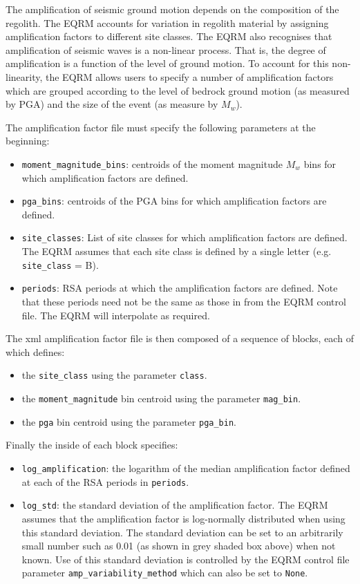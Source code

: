 The amplification of seismic ground motion depends on the composition 
of the regolith. The EQRM accounts for variation in regolith material by assigning 
amplification factors to different site classes. The EQRM also recognises that 
amplification of seismic waves is a non-linear process. That is, the degree
of amplification is a function of the level of ground motion. To account for 
this non-linearity, the EQRM allows users to specify a number of amplification 
factors which are grouped according to the level of bedrock ground motion (as 
measured by PGA) and the size of the event (as measure by $M_w$).

The amplification factor file must specify the following parameters at the beginning: 
\begin{itemize} 
\item \texttt{moment\_magnitude\_bins}: centroids of the moment magnitude $M_w$ bins
 for which amplification factors are defined. 
\item \texttt{pga\_bins}: centroids of the PGA bins for which amplification factors are defined.
\item \texttt{site\_classes}: List of site classes for which amplification factors are defined. 
The EQRM assumes that each site class is defined by a single letter (e.g. \texttt{site\_class} = B). 
\item \texttt{periods}: RSA periods at which the amplification factors are defined. Note that 
these periods need not be the same as those in  from the 
EQRM control file. The EQRM will interpolate as required. 
\end{itemize} 

The xml amplification factor file is then composed of a sequence of blocks, each of which 
defines:
\begin{itemize} 
\item the \texttt{site\_class} using the parameter \texttt{class}.
\item the \texttt{moment\_magnitude} bin centroid using the parameter \texttt{mag\_bin}. 
\item the \texttt{pga} bin centroid using the parameter \texttt{pga\_bin}. 
\end{itemize}

Finally the inside of each block specifies:
\begin{itemize}
\item \texttt{log\_amplification}: the logarithm of the median amplification factor defined at each 
of the RSA periods in \texttt{periods}.
\item \texttt{log\_std}: the standard deviation of the amplification factor. The EQRM assumes
 that the amplification factor is log-normally 
distributed when using this
standard deviation. The standard deviation can be set to an arbitrarily small 
number such as 0.01 (as shown in grey shaded box above) when not known. Use of this standard deviation is controlled by 
the EQRM control file parameter \texttt{amp\_variability\_method} which can also be set to \texttt{None}. 
\end{itemize}
